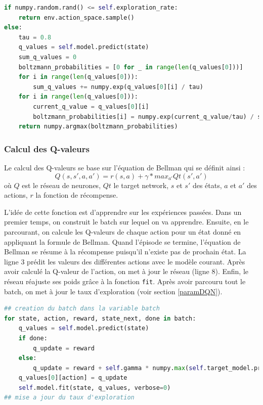 \documentclass[10pt,a4paper]{article}
\begin{document}
\begin{lstlisting}[language=Python,caption=Politique de Boltzmann]          
if numpy.random.rand() <= self.exploration_rate:
    return env.action_space.sample()
else:
    tau = 0.8
    q_values = self.model.predict(state)
    sum_q_values = 0
    boltzmann_probabilities = [0 for _ in range(len(q_values[0]))]
    for i in range(len(q_values[0])):
        sum_q_values += numpy.exp(q_values[0][i] / tau)
    for i in range(len(q_values[0])):
        current_q_value = q_values[0][i]
        boltzmann_probabilities[i] = numpy.exp(current_q_value/tau) / sum_q_values
    return numpy.argmax(boltzmann_probabilities)
\end{lstlisting}

\subsubsection{Calcul des Q-valeurs} \label{qvalDQN}
Le calcul des Q-valeurs se base sur l'équation de Bellman qui se définit ainsi :
$$Q(s,s',a,a') = r(s,a) + \gamma * max_{a'}Qt(s', a')$$ où $Q$ est le réseau de neurones, $Qt$ le target network, $s$ et $s'$ des états, $a$ et $a'$ des actions, $r$ la fonction de récompense. 

L'idée de cette fonction est d'apprendre sur les expériences passées. Dans un premier temps, on construit le batch sur lequel on va apprendre. Ensuite, en le parcourant, on calcule les Q-valeurs de chaque action pour un état donné en appliquant la formule de Bellman. Quand l'épisode se termine, l'équation de Bellman se résume à la récompense puisqu'il n'existe pas de prochain état. La ligne 3 prédit les valeurs des différentes actions avec le modèle courant. Après avoir calculé la Q-valeur de l'action, on met à jour le réseau (ligne 8). Enfin, le réseau réajuste ses poids grâce à la fonction \lstinline{fit}. Après avoir parcouru tout le batch, on met à jour le taux d'exploration (voir section \ref{paramDQN}).

\begin{lstlisting}[language=Python, caption=Expérience replay de l'agent DQN]
## creation du batch dans la variable batch
for state, action, reward, state_next, done in batch:
	q_values = self.model.predict(state)
	if done:
		q_update = reward
	else:
		q_update = reward + self.gamma * numpy.max(self.target_model.predict(next_state)[0])
	q_values[0][action] = q_update
	self.model.fit(state, q_values, verbose=0)
## mise a jour du taux d'exploration
\end{lstlisting}
\end{document}
